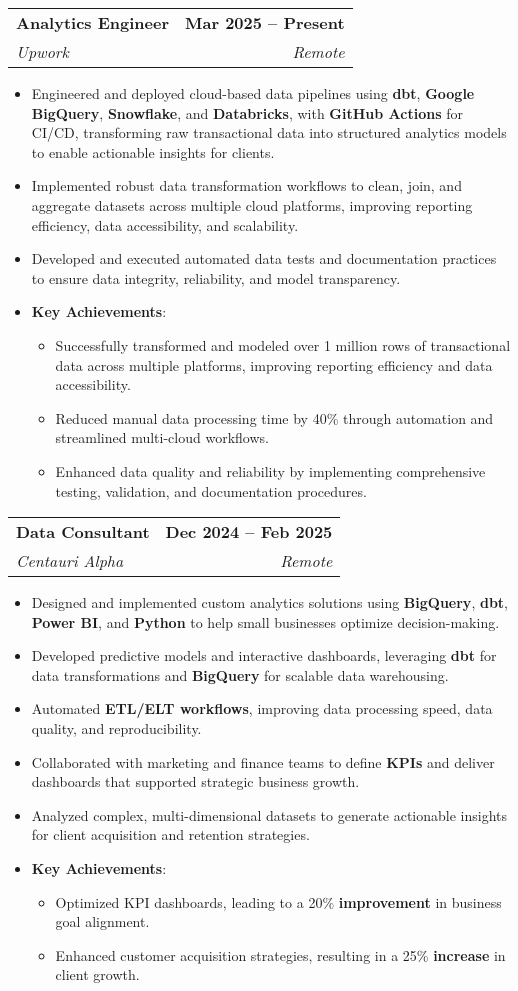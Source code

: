 \documentclass[letterpaper,11pt]{article}
\makeatletter
\newcommand{\resumeItem}[1]{
  \item\small{
    {#1 \vspace{-2pt}}
  }
}
\newcommand{\resumeSubheading}[4]{
  \vspace{-2pt}\item
    \begin{tabular*}{1.0\textwidth}[t]{l@{\extracolsep{\fill}}r}
      \textbf{#1} & \textbf{\small #2} \\
      \textit{\small#3} & \textit{\small #4} \\
    \end{tabular*}\vspace{-7pt}
}
\newcommand{\resumeItemListStart}{\begin{itemize}}
\newcommand{\resumeItemListEnd}{\end{itemize}\vspace{-5pt}}
\makeatother
\begin{document}
\resumeSubheading
{Analytics Engineer}{Mar 2025 -- Present}
{Upwork}{Remote}
\resumeItemListStart
\resumeItem{Engineered and deployed cloud-based data pipelines using \textbf{dbt}, \textbf{Google BigQuery}, \textbf{Snowflake}, and \textbf{Databricks}, with \textbf{GitHub Actions} for CI/CD, transforming raw transactional data into structured analytics models to enable actionable insights for clients.}
\resumeItem{Implemented robust data transformation workflows to clean, join, and aggregate datasets across multiple cloud platforms, improving reporting efficiency, data accessibility, and scalability.}
\resumeItem{Developed and executed automated data tests and documentation practices to ensure data integrity, reliability, and model transparency.}
\resumeItem{\textbf{Key Achievements}: 
\vspace{-4pt}
    \begin{itemize}
        \item Successfully transformed and modeled over 1 million rows of transactional data across multiple platforms, improving reporting efficiency and data accessibility.
        \item Reduced manual data processing time by 40\% through automation and streamlined multi-cloud workflows.
        \item Enhanced data quality and reliability by implementing comprehensive testing, validation, and documentation procedures.
    \end{itemize}
}
\resumeItemListEnd

\resumeSubheading
{Data Consultant}{Dec 2024 -- Feb 2025}
{Centauri Alpha}{Remote}
\resumeItemListStart
\resumeItem{Designed and implemented custom analytics solutions using \textbf{BigQuery}, \textbf{dbt}, \textbf{Power BI}, and \textbf{Python} to help small businesses optimize decision-making.}
\resumeItem{Developed predictive models and interactive dashboards, leveraging \textbf{dbt} for data transformations and \textbf{BigQuery} for scalable data warehousing.}
\resumeItem{Automated \textbf{ETL/ELT workflows}, improving data processing speed, data quality, and reproducibility.}
\resumeItem{Collaborated with marketing and finance teams to define \textbf{KPIs} and deliver dashboards that supported strategic business growth.}
\resumeItem{Analyzed complex, multi-dimensional datasets to generate actionable insights for client acquisition and retention strategies.}
\resumeItem{\textbf{Key Achievements}: 
\vspace{-4pt}
    \begin{itemize}
        \item Optimized KPI dashboards, leading to a 20\% \textbf{improvement} in business goal alignment.  
        \item Enhanced customer acquisition strategies, resulting in a 25\% \textbf{increase} in client growth.  
    \end{itemize}
}
\resumeItemListEnd
\end{document}
